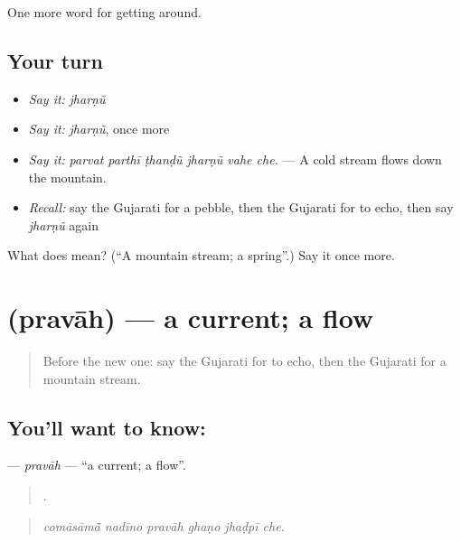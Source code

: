 \begin{grammarlens}[title={What you've built}]
One more word for getting around.
\end{grammarlens}

\subsection*{Your turn}
\begin{itemize}
\raggedright
  \item \emph{Say it:} \emph{jharṇũ}
  \item \emph{Say it:} \emph{jharṇũ}, once more
  \item \emph{Say it:} \emph{parvat parthī ṭhanḍũ jharṇũ vahe che.} — A cold stream flows down the mountain.
  \item \emph{Recall:} say the Gujarati for a pebble, then the Gujarati for to echo, then say \emph{jharṇũ} again
\end{itemize}

\begin{tcolorbox}[breakable,colback=teal!4,colframe=teal!35!black,title={Before you move on}]
What does  mean? (\textquotedblleft{}A mountain stream; a spring\textquotedblright{}.) Say it once more.
\end{tcolorbox}
\section[\texorpdfstring{\gu{પ્રવાહ} (pravāh)}{પ્રવાહ (pravāh)}]{ (pravāh) — a current; a flow}

\label{lesson:GU-C440-pravah}



\begin{quote}
Before the new one: say the Gujarati for to echo, then the Gujarati for a mountain stream.
\end{quote}

\subsection*{You'll want to know: }
\textbf{} — \emph{pravāh} — \textquotedblleft{}a current; a flow\textquotedblright{}.

\begin{quote}
     .
\end{quote}

\begin{quote}
\emph{comāsāmā̃ nadīno pravāh ghaṇo jhaḍpī che.}
\end{quote}

